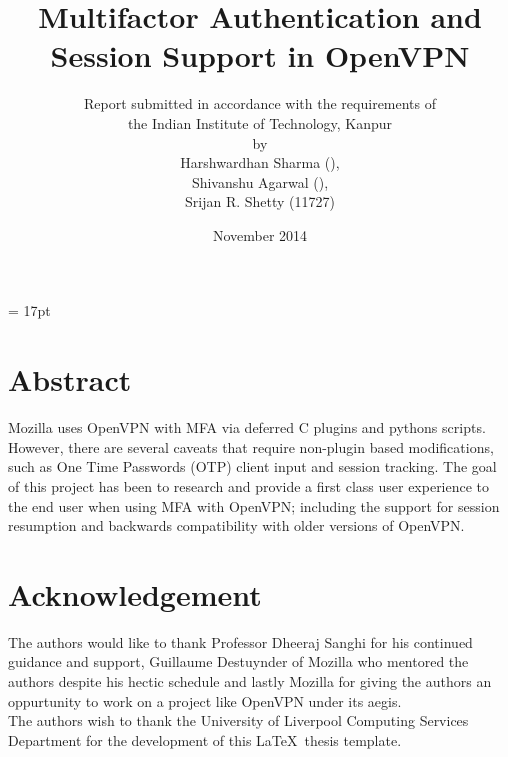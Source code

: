 \documentclass[11pt,oneside]{book}
\begin{document}
\baselineskip = 17pt


\title{Multifactor Authentication and Session Support in OpenVPN}
\author{Report submitted in accordance with the requirements of \\
the Indian Institute of Technology, Kanpur \\
by \\
Harshwardhan Sharma (),\\
Shivanshu Agarwal (),\\
Srijan R. Shetty (11727)}
\date{November 2014}
\maketitle
\frontmatter

\chapter{Abstract}
Mozilla uses OpenVPN with MFA via deferred C plugins and pythons scripts.
However, there are several caveats that require non-plugin based modifications,
such as One Time Passwords (OTP) client input and session tracking.
The goal of this project has been to research and provide a first class user experience
to the end user when using MFA with OpenVPN; including the support for session resumption
and backwards compatibility with older versions of OpenVPN.

\tableofcontents



\listoffigures





\chapter{Acknowledgement}

The authors would like to thank Professor Dheeraj Sanghi for his continued guidance
and support, Guillaume Destuynder of Mozilla who mentored the authors despite his
hectic schedule and lastly Mozilla for giving the authors an oppurtunity to work on
a project like OpenVPN under its aegis.\\
The authors wish to thank the University of
Liverpool Computing Services Department for the development of this
\LaTeX \ thesis template.
\end{document}
